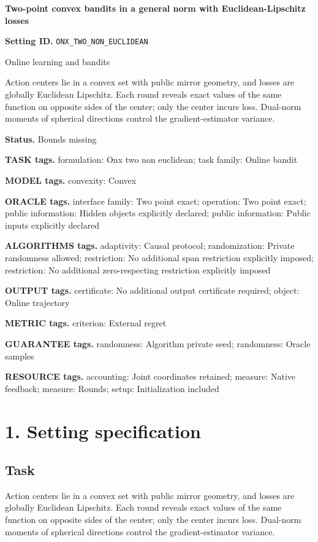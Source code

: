 \documentclass[10pt,a4paper]{article}
\begin{document}
\raggedright

{\LARGE\bfseries\sffamily\color{AtlasNavy} Two-point convex bandits in a general norm with Euclidean-Lipschitz losses\par}\vspace{5pt}
\textbf{Setting ID.} \texttt{ONX\_\allowbreak{}TWO\_\allowbreak{}NON\_\allowbreak{}EUCLIDEAN}

Online learning and bandits

Action centers lie in a convex set with public mirror geometry, and losses are globally Euclidean Lipschitz. Each round reveals exact values of the same function on opposite sides of the center; only the center incurs loss. Dual-norm moments of spherical directions control the gradient-estimator variance.

\textbf{Status.} Bounds missing

\textbf{TASK tags.} formulation: Onx two non euclidean; task family: Online bandit

\textbf{MODEL tags.} convexity: Convex

\textbf{ORACLE tags.} interface family: Two point exact; operation: Two point exact; public information: Hidden objects explicitly declared; public information: Public inputs explicitly declared

\textbf{ALGORITHMS tags.} adaptivity: Causal protocol; randomization: Private randomness allowed; restriction: No additional span restriction explicitly imposed; restriction: No additional zero-respecting restriction explicitly imposed

\textbf{OUTPUT tags.} certificate: No additional output certificate required; object: Online trajectory

\textbf{METRIC tags.} criterion: External regret

\textbf{GUARANTEE tags.} randomness: Algorithm private seed; randomness: Oracle samples

\textbf{RESOURCE tags.} accounting: Joint coordinates retained; measure: Native feedback; measure: Rounds; setup: Initialization included

\section{1. Setting specification}
\subsection{Task}
Action centers lie in a convex set with public mirror geometry, and losses are globally Euclidean Lipschitz. Each round reveals exact values of the same function on opposite sides of the center; only the center incurs loss. Dual-norm moments of spherical directions control the gradient-estimator variance.
\end{document}

